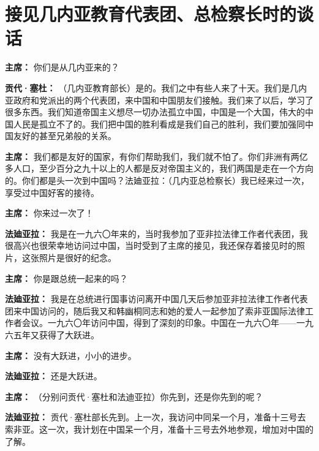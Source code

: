 \section[接见几内亚教育代表团、总检察长时的谈话（一九六五年八月八日）]{接见几内亚教育代表团、总检察长时的谈话}

\begin{duihua}

\item[\textbf{主席：}] 你们是从几内亚来的？

\item[\textbf{贡代·塞杜：}] （几内亚教育部长）是的。我们之中有些人来了十天。我们是几内亚政府和党派出的两个代表团，来中国和中国朋友们接触。我们来了以后，学习了很多东西。我们知道帝国主义想尽一切办法孤立中国，中国是一个大国，伟大的中国人民是孤立不了的。我们把中国的胜利看成是我们自己的胜利，我们要加强同中国友好的甚至兄弟般的关系。

\item[\textbf{主席：}] 我们都是友好的国家，有你们帮助我们，我们就不怕了。你们非洲有两亿多人口，至少百分之九十以上的人都是反对帝国主义的，我们两国是走在一个方向的。你们都是头一次到中国吗？法廸亚拉：（几内亚总检察长）我已经来过一次，享受过中国好客的接待。

\item[\textbf{主席：}] 你来过一次了！

\item[\textbf{法廸亚拉：}] 我是在一九六〇年来的，当时我参加了亚非拉法律工作者代表团，我很高兴也很荣幸地访问过中国，当时受到了主席的接见，我还保存着接见时的照片，这张照片是很好的纪念。

\item[\textbf{主席：}] 你是跟总统一起来的吗？

\item[\textbf{法廸亚拉：}] 我是在总统进行国事访问离开中国几天后参加亚非拉法律工作者代表团来中国访问的，随后我又和韩幽桐同志和她的爱人一起参加了索非亚国际法律工作者会议。一九六〇年访问中国，得到了深刻的印象。中国在一九六〇年——一九六五年又获得了大跃进。

\item[\textbf{主席：}] 没有大跃进，小小的进步。

\item[\textbf{法廸亚拉：}] 还是大跃进。

\item[\textbf{主席：}] （分别问贡代·塞杜和法迪亚拉）你先到，还是你先到的呢？

\item[\textbf{法廸亚拉：}] 贡代·塞杜部长先到。上一次，我访问中同呆一个月，准备十三号去索非亚。这一次，我计划在中国呆一个月，准备十三号去外地参观，增加对中国的了解。


\end{duihua}
